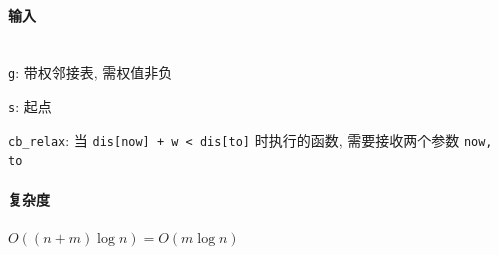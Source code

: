 \paragraph{输入}~\\

\verb|g|: 带权邻接表, 需权值非负

\verb|s|: 起点

\verb|cb_relax|: 当 \verb|dis[now] + w < dis[to]| 时执行的函数, 需要接收两个参数 \verb|now, to|

\paragraph{复杂度} \(O((n+m)\log n)=O(m\log n)\)

